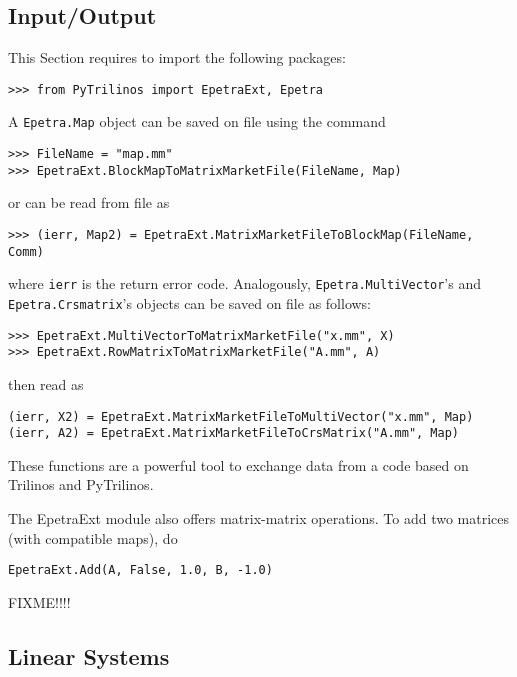\documentclass[10pt,relax]{SANDreport}
\begin{document}
\subsection{Input/Output}
\label{sec:io}

This Section requires to import the following packages:
\begin{verbatim}
>>> from PyTrilinos import EpetraExt, Epetra
\end{verbatim}

\smallskip

A {\tt Epetra.Map} object can be saved on file using the command
\begin{verbatim}
>>> FileName = "map.mm"
>>> EpetraExt.BlockMapToMatrixMarketFile(FileName, Map)
\end{verbatim}
or can be read from file as
\begin{verbatim}
>>> (ierr, Map2) = EpetraExt.MatrixMarketFileToBlockMap(FileName, Comm)
\end{verbatim}
where \verb!ierr! is the return error code. Analogously, 
\verb!Epetra.MultiVector!'s and \verb!Epetra.Crsmatrix!'s objects
can be saved on file as follows:
\begin{verbatim}
>>> EpetraExt.MultiVectorToMatrixMarketFile("x.mm", X)
>>> EpetraExt.RowMatrixToMatrixMarketFile("A.mm", A)
\end{verbatim}
then read as
\begin{verbatim}
(ierr, X2) = EpetraExt.MatrixMarketFileToMultiVector("x.mm", Map)
(ierr, A2) = EpetraExt.MatrixMarketFileToCrsMatrix("A.mm", Map)
\end{verbatim}
These functions are a powerful tool to exchange data from a code based on
Trilinos and PyTrilinos.

The EpetraExt module also offers matrix-matrix operations. To add two matrices
(with compatible maps), do
\begin{verbatim}
EpetraExt.Add(A, False, 1.0, B, -1.0)
\end{verbatim}

FIXME!!!!

\subsection{Linear Systems}
\label{sec:linear}
\end{document}
